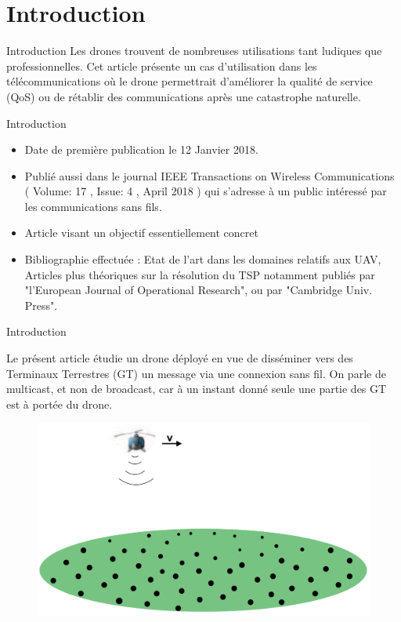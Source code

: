 

\section {Introduction}

\begin{frame}{Introduction}
  Les drones trouvent de nombreuses utilisations tant ludiques que professionnelles. Cet article présente un cas d'utilisation dans les télécommunications où le drone permettrait d'améliorer la qualité de service (QoS) ou de rétablir des communications après une catastrophe naturelle. 
 
 
\end{frame}


\begin{frame}{Introduction}
\begin{itemize}
	
	\item Date de première publication le 12 Janvier 2018.
	
	\item Publié aussi dans le journal IEEE Transactions on Wireless Communications 
	( Volume: 17 , Issue: 4 , April 2018 ) qui s'adresse à un public intéressé par les communications sans fils.
	
	\item Article visant un objectif essentiellement concret
	\item Bibliographie effectuée : Etat de l'art dans les domaines relatifs aux UAV, Articles plus théoriques sur 
	la résolution du TSP notamment publiés par "l'European Journal of Operational Research",
	ou par "Cambridge Univ. Press".
	
\end{itemize}
\end{frame}
 
\begin{frame}{Introduction}

Le présent article étudie un drone déployé en vue de disséminer vers des Terminaux Terrestres (GT) un message via une connexion sans fil. On parle de multicast, et non de broadcast, car à un instant donné seule une partie des GT est à portée du drone.

\begin{figure}
	\centering
	\includegraphics[width=0.7\linewidth]{images/multicast}
	\caption{}
	\label{fig:multicast}
\end{figure}

\end{frame}

